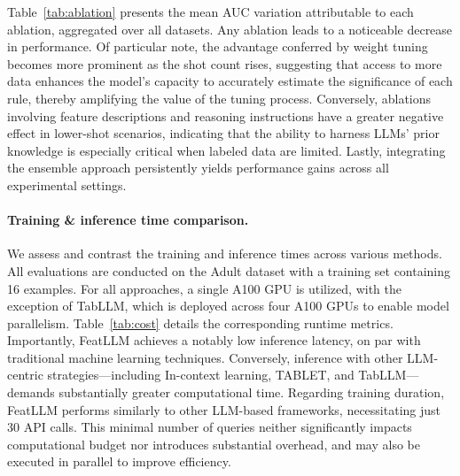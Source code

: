 Table~\ref{tab:ablation} presents the mean AUC variation attributable to each ablation, aggregated over all datasets. Any ablation leads to a noticeable decrease in performance. Of particular note, the advantage conferred by weight tuning becomes more prominent as the shot count rises, suggesting that access to more data enhances the model’s capacity to accurately estimate the significance of each rule, thereby amplifying the value of the tuning process. Conversely, ablations involving feature descriptions and reasoning instructions have a greater negative effect in lower-shot scenarios, indicating that the ability to harness LLMs' prior knowledge is especially critical when labeled data are limited. Lastly, integrating the ensemble approach persistently yields performance gains across all experimental settings.

\vspace*{-0.12in}
\paragraph{Training \& inference time comparison.} We assess and contrast the training and inference times across various methods. All evaluations are conducted on the Adult dataset with a training set containing 16 examples. For all approaches, a single A100 GPU is utilized, with the exception of TabLLM, which is deployed across four A100 GPUs to enable model parallelism. Table~\ref{tab:cost} details the corresponding runtime metrics. Importantly, \textsf{FeatLLM} achieves a notably low inference latency, on par with traditional machine learning techniques. Conversely, inference with other LLM-centric strategies—including In-context learning, TABLET, and TabLLM—demands substantially greater computational time. Regarding training duration, \textsf{FeatLLM} performs similarly to other LLM-based frameworks, necessitating just 30 API calls. This minimal number of queries neither significantly impacts computational budget nor introduces substantial overhead, and may also be executed in parallel to improve efficiency.

\vspace*{-0.12in}
